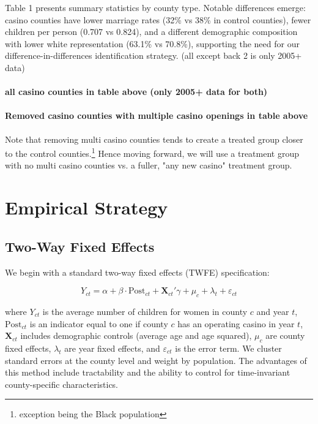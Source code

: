 \documentclass[12pt]{article}
\begin{document}
Table 1 presents summary statistics by county type. Notable differences emerge: casino counties have lower marriage rates (32\% vs 38\% in control counties), fewer children per person (0.707 vs 0.824), and a different demographic composition with lower white representation (63.1\% vs 70.8\%), supporting the need for our difference-in-differences identification strategy. (all except back 2 is only 2005+ data) 

\newpage
\begin{center}
\paragraph{all casino counties in table above (only 2005+ data for both)}

\paragraph{Removed casino counties with multiple casino openings in table above}

\end{center}
Note that removing multi casino counties tends to create a treated group closer to the control counties.\footnote{exception being the Black population} Hence moving forward, we will use a treatment group with no multi casino counties vs. a fuller, "any new casino" treatment group. 

\section{Empirical Strategy}

\subsection{Two-Way Fixed Effects}

We begin with a standard two-way fixed effects (TWFE) specification:

\begin{equation}
Y_{ct} = \alpha + \beta \cdot \text{Post}_{ct} + \mathbf{X}_{ct}'\gamma + \mu_c + \lambda_t + \varepsilon_{ct}
\end{equation}

\noindent where $Y_{ct}$ is the average number of children for women in county $c$ and year $t$, $\text{Post}_{ct}$ is an indicator equal to one if county $c$ has an operating casino in year $t$, $\mathbf{X}_{ct}$ includes demographic controls (average age and age squared), $\mu_c$ are county fixed effects, $\lambda_t$ are year fixed effects, and $\varepsilon_{ct}$ is the error term. We cluster standard errors at the county level and weight by population. The advantages of this method include tractability and the ability to control for time-invariant county-specific characteristics.
\end{document}
